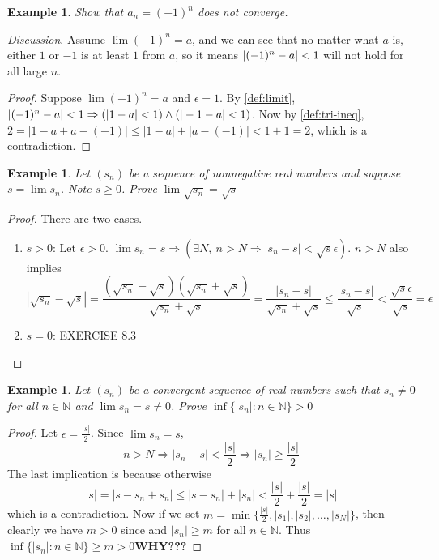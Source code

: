 \documentclass[12pt, lettersize]{book}
\newtheorem{eg}[thm]{Example}
\begin{document}
	\begin{eg}
		Show that $a_n=(-1)^n$ does not converge.
	\end{eg}
	\emph{Discussion}. Assume $\lim(-1)^n=a$, and we can see that no matter what $a$ is, either $1$ or $-1$ is at least
	$1$ from $a$, so it means $\abs{(-1)^n-a}<1$ will not hold for all large $n$.
	\begin{proof}
		Suppose $\lim(-1)^n=a$ and $\epsilon = 1$. By \ref{def:limit}, $\abs{(-1)^n-a}<1 \Rightarrow (|1-a|<1)\land(|-1-a|<1)$.
		Now by \ref{def:tri-ineq}, $2=|1-a+a-(-1)|\leq|1-a|+|a-(-1)|<1+1=2$, which is a contradiction. 
	\end{proof}
	
	\begin{eg}
		Let $(s_n)$ be a sequence of nonnegative real numbers and suppose $s=\lim s_n$. Note $s\geq0$. Prove $\lim\sqrt{s_n}=\sqrt{s}$
	\end{eg}
	\begin{proof}
		There are two cases.
		\begin{enumerate}
			\item $s>0$: Let $\epsilon>0$. $\lim s_n=s \Rightarrow (\exists N,\ n>N \Rightarrow |s_n-s|<\sqrt{s}\epsilon)$.
			$n>N$ also implies
			\begin{displaymath}
				|\sqrt{s_n}-\sqrt{s}|=\frac{(\sqrt{s_n}-\sqrt{s})(\sqrt{s_n}+\sqrt{s})}{\sqrt{s_n}+\sqrt{s}}=\frac{|s_n-s|}{\sqrt{s_n}+\sqrt{s}}\leq\frac{|s_n-s|}{\sqrt{s}}<\frac{\sqrt{s}\epsilon}{\sqrt{s}}=\epsilon
			\end{displaymath}
			\item $s=0$: EXERCISE 8.3 
		\end{enumerate}
	\end{proof}
	
	\begin{eg}
		Let $(s_n)$ be a convergent sequence of real numbers such that $s_n\neq0$ for all $n\in \mathbb{N}$ and $\lim s_n=s
		\neq0$. Prove $\inf\{|s_n|: n\in\mathbb{N}\}>0$
	\end{eg}
	\begin{proof}
		Let $\epsilon=\frac{|s|}{2}$. Since $\lim s_n=s$,
		\begin{displaymath}
			n>N \Rightarrow |s_n-s|<\frac{|s|}{2} \Rightarrow |s_n|\geq\frac{|s|}{2}
		\end{displaymath}
		The last implication is because otherwise 
		\begin{displaymath}
			|s|=|s-s_n+s_n|\leq|s-s_n|+|s_n|<\frac{|s|}{2}+\frac{|s|}{2}=|s|
		\end{displaymath}
		which is a contradiction. Now if we set $m=\min\{\frac{|s|}{2},|s_1|,|s_2|,\dots,|s_N|\}$, then clearly we have
		$m>0$ since and $|s_n|\geq m$ for all $n\in \mathbb{N}$. Thus $\inf\{|s_n|: n\in\mathbb{N}\}\geq m>0$\textbf{WHY???} 
	\end{proof}
	\newpage
	
\end{document}
